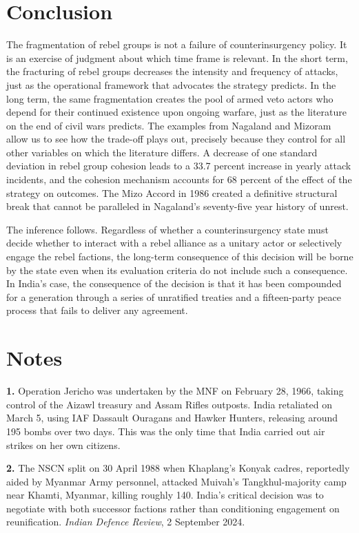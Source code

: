 \documentclass[12pt,a4paper]{article}
\begin{document}
\section{Conclusion}
The fragmentation of rebel groups is not a failure of counterinsurgency policy. It is an exercise of judgment about which time frame is relevant. In the short term, the fracturing of rebel groups decreases the intensity and frequency of attacks, just as the operational framework that advocates the strategy predicts. In the long term, the same fragmentation creates the pool of armed veto actors who depend for their continued existence upon ongoing warfare, just as the literature on the end of civil wars predicts. The examples from Nagaland and Mizoram allow us to see how the trade-off plays out, precisely because they control for all other variables on which the literature differs. A decrease of one standard deviation in rebel group cohesion leads to a 33.7 percent increase in yearly attack incidents, and the cohesion mechanism accounts for 68 percent of the effect of the strategy on outcomes. The Mizo Accord in 1986 created a definitive structural break that cannot be paralleled in Nagaland's seventy-five year history of unrest.

The inference follows. Regardless of whether a counterinsurgency state must decide whether to interact with a rebel alliance as a unitary actor or selectively engage the rebel factions, the long-term consequence of this decision will be borne by the state even when its evaluation criteria do not include such a consequence. In India's case, the consequence of the decision is that it has been compounded for a generation through a series of unratified treaties and a fifteen-party peace process that fails to deliver any agreement.

\newpage
\section*{Notes}

\noindent\textbf{1.} Operation Jericho was undertaken by the MNF on February 28, 1966, taking control of the Aizawl treasury and Assam Rifles outposts. India retaliated on March 5, using IAF Dassault Ouragans and Hawker Hunters, releasing around 195 bombs over two days. This was the only time that India carried out air strikes on her own citizens.

\vspace{0.4em}
\noindent\textbf{2.} The NSCN split on 30 April 1988 when Khaplang's Konyak cadres, reportedly aided by Myanmar Army personnel, attacked Muivah's Tangkhul-majority camp near Khamti, Myanmar, killing roughly 140. India's critical decision was to negotiate with both successor factions rather than conditioning engagement on reunification. \textit{Indian Defence Review}, 2 September 2024.
\end{document}
